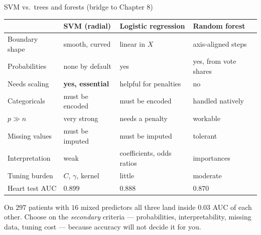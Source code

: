 \documentclass[aspectratio=169,11pt]{beamer}
\begin{document}
\begin{frame}{SVM vs.\ trees and forests (bridge to Chapter 8)}
  \scriptsize
  \begin{center}
  \begin{tabular}{@{}p{2.8cm}p{3.2cm}p{3.4cm}p{3.0cm}@{}}
    \toprule
     & \textbf{SVM (radial)} & \textbf{Logistic regression} & \textbf{Random forest} \\
    \midrule
    Boundary shape & smooth, curved & linear in $X$ & axis-aligned steps \\
    Probabilities & none by default & yes & yes, from vote shares \\
    Needs scaling & \textbf{yes, essential} & helpful for penalties & no \\
    Categoricals & must be encoded & must be encoded & handled natively \\
    $p \gg n$ & very strong & needs a penalty & workable \\
    Missing values & must be imputed & must be imputed & tolerant \\
    Interpretation & weak & coefficients, odds ratios & importances \\
    Tuning burden & $C$, $\gamma$, kernel & little & moderate \\
    Heart test AUC & $0.899$ & $0.888$ & $0.870$ \\
    \bottomrule
  \end{tabular}
  \end{center}
  \begin{takeaway}
    On $297$ patients with $16$ mixed predictors all three land inside $0.03$
    AUC of each other. Choose on the \emph{secondary} criteria ---
    probabilities, interpretability, missing data, tuning cost --- because
    accuracy will not decide it for you.
  \end{takeaway}
\end{frame}
\end{document}
